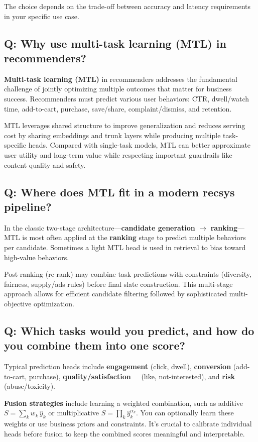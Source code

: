 The choice depends on the trade-off between accuracy and latency requirements in your specific use case.

\subsection*{Q: Why use multi-task learning (MTL) in recommenders?}
\textbf{Multi-task learning (MTL)} in recommenders addresses the fundamental challenge of jointly optimizing multiple outcomes that matter for business success. Recommenders must predict various user behaviors: CTR, dwell/watch time, add-to-cart, purchase, save/share, complaint/dismiss, and retention.

MTL leverages shared structure to improve generalization and reduces serving cost by sharing embeddings and trunk layers while producing multiple task-specific heads. Compared with single-task models, MTL can better approximate user utility and long-term value while respecting important guardrails like content quality and safety.

\subsection*{Q: Where does MTL fit in a modern recsys pipeline?}
In the classic two-stage architecture---\textbf{candidate generation} $\rightarrow$ \textbf{ranking}---MTL is most often applied at the \textbf{ranking} stage to predict multiple behaviors per candidate. Sometimes a light MTL head is used in retrieval to bias toward high-value behaviors.

Post-ranking (re-rank) may combine task predictions with constraints (diversity, fairness, supply/ads rules) before final slate construction. This multi-stage approach allows for efficient candidate filtering followed by sophisticated multi-objective optimization.

\subsection*{Q: Which tasks would you predict, and how do you combine them into one score?}
Typical prediction heads include \textbf{engagement} (click, dwell), \textbf{conversion} (add-to-cart, purchase), \textbf{quality/satisfaction\
	\
} (like, not-interested), and \textbf{risk} (abuse/toxicity).

\textbf{Fusion strategies} include learning a weighted combination, such as additive $S=\sum_k w_k \,\hat y_k$ or multiplicative $S=\prod_k \hat y_k^{\alpha_k}$. You can optionally learn these weights or use business priors and constraints. It's crucial to calibrate individual heads before fusion to keep the combined scores meaningful and interpretable.

